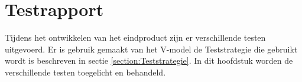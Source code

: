 \section{Testrapport}
Tijdens het ontwikkelen van het eindproduct zijn er verschillende testen uitgevoerd.
Er is gebruik gemaakt van het V-model de Teststrategie die gebruikt wordt is beschreven in sectie \ref{section:Teststrategie}.
In dit hoofdstuk worden de verschillende testen toegelicht en behandeld.



\newpage



